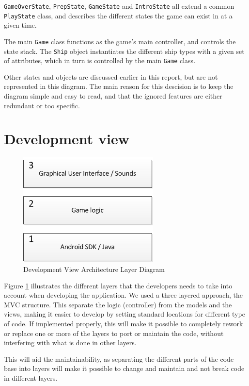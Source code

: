 \texttt{GameOverState}, \texttt{PrepState}, \texttt{GameState} and \texttt{IntroState} all extend a common \texttt{PlayState} class, and describes the different states the game can exist in at a given time.

The main \texttt{Game} class functions as the game's main controller, and controls the state stack. The \texttt{Ship} object instantiates the different ship types with a given set of attributes, which in turn is controlled by the main \texttt{Game} class.

Other states and objects are discussed earlier in this report, but are not represented in this diagram. The main reason for this descision is to keep the diagram simple and easy to read, and that the ignored features are either redundant or too specific.



\section{Development view}


\begin{figure}[ht]
    \includegraphics[scale=0.65]{DevelopmentView.png}
    \caption{Development View Architecture Layer Diagram}
    \label{fig:DevelopmentView}
\end{figure}

Figure \ref{fig:DevelopmentView} illustrates the different layers that the developers needs to take into account when developing the application. We used a three layered approach, the MVC structure. This separate the logic (controller) from the models and the views, making it easier to develop by setting standard locations for different type of code. If implemented properly, this will make it possible to completely rework or replace one or more of the layers to port or maintain the code, without interfering with what is done in other layers.

This will aid the maintainability, as separating the different parts of the code base into layers will make it possible to change and maintain and not break code in different layers.

